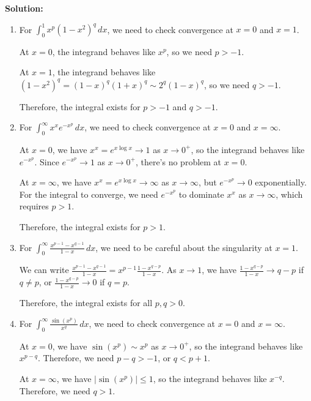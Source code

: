 \noindent\textbf{Solution:}
\begin{enumerate}[label=(\alph*)]
    \item For $\int_{0}^{1} x^p (1 - x^2)^q \, dx$, we need to check convergence at $x = 0$ and $x = 1$.
    
    At $x = 0$, the integrand behaves like $x^p$, so we need $p > -1$.
    
    At $x = 1$, the integrand behaves like $(1 - x^2)^q = (1 - x)^q (1 + x)^q \sim 2^q (1 - x)^q$, so we need $q > -1$.
    
    Therefore, the integral exists for $p > -1$ and $q > -1$.
    
    \item For $\int_{0}^{\infty} x^x e^{-x^p} \, dx$, we need to check convergence at $x = 0$ and $x = \infty$.
    
    At $x = 0$, we have $x^x = e^{x \log x} \to 1$ as $x \to 0^+$, so the integrand behaves like $e^{-x^p}$. Since $e^{-x^p} \to 1$ as $x \to 0^+$, there's no problem at $x = 0$.
    
    At $x = \infty$, we have $x^x = e^{x \log x} \to \infty$ as $x \to \infty$, but $e^{-x^p} \to 0$ exponentially. For the integral to converge, we need $e^{-x^p}$ to dominate $x^x$ as $x \to \infty$, which requires $p > 1$.
    
    Therefore, the integral exists for $p > 1$.
    
    \item For $\int_{0}^{\infty} \frac{x^{p-1} - x^{q-1}}{1 - x} \, dx$, we need to be careful about the singularity at $x = 1$.
    
    We can write $\frac{x^{p-1} - x^{q-1}}{1 - x} = x^{p-1} \frac{1 - x^{q-p}}{1 - x}$. As $x \to 1$, we have $\frac{1 - x^{q-p}}{1 - x} \to q - p$ if $q \neq p$, or $\frac{1 - x^{q-p}}{1 - x} \to 0$ if $q = p$.
    
    Therefore, the integral exists for all $p, q > 0$.
    
    \item For $\int_{0}^{\infty} \frac{\sin(x^p)}{x^q} \, dx$, we need to check convergence at $x = 0$ and $x = \infty$.
    
    At $x = 0$, we have $\sin(x^p) \sim x^p$ as $x \to 0^+$, so the integrand behaves like $x^{p-q}$. Therefore, we need $p - q > -1$, or $q < p + 1$.
    
    At $x = \infty$, we have $|\sin(x^p)| \leq 1$, so the integrand behaves like $x^{-q}$. Therefore, we need $q > 1$.
    

\end{enumerate}
